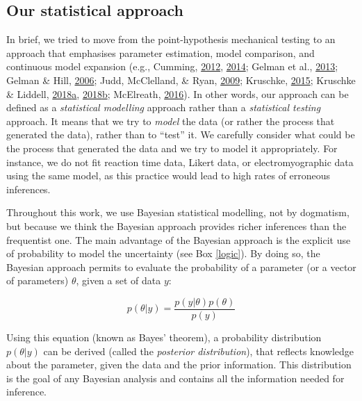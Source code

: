 \documentclass[a4paper,12pt,twoside,openright,oldfontcommands]{memoir}
\begin{document}
\hypertarget{our-statistical-approach}{%
\subsection{Our statistical approach}\label{our-statistical-approach}}

In brief, we tried to move from the point-hypothesis mechanical testing to an approach that emphasises parameter estimation, model comparison, and continuous model expansion (e.g., Cumming, \protect\hyperlink{ref-Cumming2012}{2012}, \protect\hyperlink{ref-cumming_new_2014}{2014}; Gelman et al., \protect\hyperlink{ref-gelman_bayesian_2013}{2013}; Gelman \& Hill, \protect\hyperlink{ref-gelman_data_2006}{2006}; Judd, McClelland, \& Ryan, \protect\hyperlink{ref-judd_data_2009}{2009}; Kruschke, \protect\hyperlink{ref-kruschke_doing_2015}{2015}; Kruschke \& Liddell, \protect\hyperlink{ref-kruschke_bayesian_2018}{2018}\protect\hyperlink{ref-kruschke_bayesian_2018}{a}, \protect\hyperlink{ref-kruschke_bayesian_2018-1}{2018}\protect\hyperlink{ref-kruschke_bayesian_2018-1}{b}; McElreath, \protect\hyperlink{ref-R-rethinking}{2016}). In other words, our approach can be defined as a \emph{statistical modelling} approach rather than a \emph{statistical testing} approach. It means that we try to \emph{model} the data (or rather the process that generated the data), rather than to \enquote{test} it. We carefully consider what could be the process that generated the data and we try to model it appropriately. For instance, we do not fit reaction time data, Likert data, or electromyographic data using the same model, as this practice would lead to high rates of erroneous inferences.

Throughout this work, we use Bayesian statistical modelling, not by dogmatism, but because we think the Bayesian approach provides richer inferences than the frequentist one. The main advantage of the Bayesian approach is the explicit use of probability to model the uncertainty (see Box \ref{logic}). By doing so, the Bayesian approach permits to evaluate the probability of a parameter (or a vector of parameters) \(\theta\), given a set of data \(y\):

\[p(\theta|y) = \frac{p(y|\theta)p(\theta)}{p(y)}\]

Using this equation (known as Bayes' theorem), a probability distribution \(p(\theta|y)\) can be derived (called the \emph{posterior distribution}), that reflects knowledge about the parameter, given the data and the prior information. This distribution is the goal of any Bayesian analysis and contains all the information needed for inference.
\end{document}
